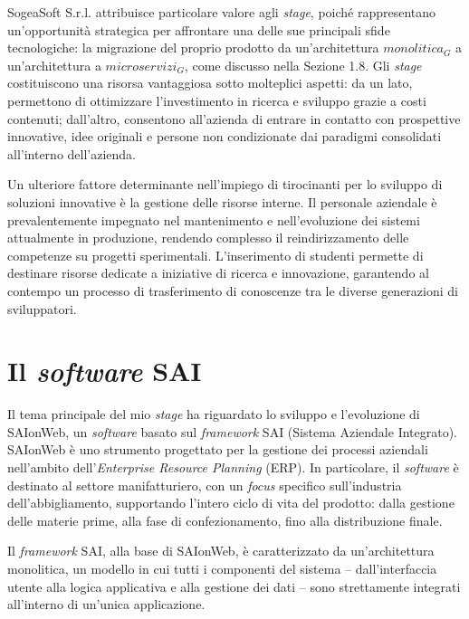    \vspace{0.2 em}
    \noindent SogeaSoft S.r.l. attribuisce particolare valore agli \textit{stage}, poiché rappresentano un'opportunità strategica per affrontare una delle sue principali sfide tecnologiche: la migrazione del proprio prodotto da un’architettura $monolitica_G$ a un’architettura a $microservizi_G$, come discusso nella Sezione 1.8. Gli \textit{stage} costituiscono una risorsa vantaggiosa sotto molteplici aspetti: da un lato, permettono di ottimizzare l’investimento in ricerca e sviluppo grazie a costi contenuti; dall’altro, consentono all’azienda di entrare in contatto con prospettive innovative, idee originali e persone non condizionate dai paradigmi consolidati all'interno dell’azienda.  

    \vspace{0.2 em}
    \noindent Un ulteriore fattore determinante nell’impiego di tirocinanti per lo sviluppo di soluzioni innovative è la gestione delle risorse interne. Il personale aziendale è prevalentemente impegnato nel mantenimento e nell’evoluzione dei sistemi attualmente in produzione, rendendo complesso il reindirizzamento delle competenze su progetti sperimentali. L’inserimento di studenti permette di destinare risorse dedicate a iniziative di ricerca e innovazione, garantendo al contempo un processo di trasferimento di conoscenze tra le diverse generazioni di sviluppatori.
    
    \section{Il \textit{software} SAI}
    
    Il tema principale del mio \textit{stage} ha riguardato lo sviluppo e l’evoluzione di SAIonWeb, un \textit{software} basato sul \textit{framework} SAI (Sistema Aziendale Integrato). SAIonWeb è uno strumento progettato per la gestione dei processi aziendali nell’ambito dell’\textit{Enterprise Resource Planning} (ERP). In particolare, il \textit{software} è destinato al settore manifatturiero, con un \textit{focus} specifico sull'industria dell’abbigliamento, supportando l'intero ciclo di vita del prodotto: dalla gestione delle materie prime, alla fase di confezionamento, fino alla distribuzione finale.  

    \vspace{0.2 em}
    \noindent Il \textit{framework} SAI, alla base di SAIonWeb, è caratterizzato da un'architettura monolitica, un modello in cui tutti i componenti del sistema – dall’interfaccia utente alla logica applicativa e alla gestione dei dati – sono strettamente integrati all’interno di un'unica applicazione.  

